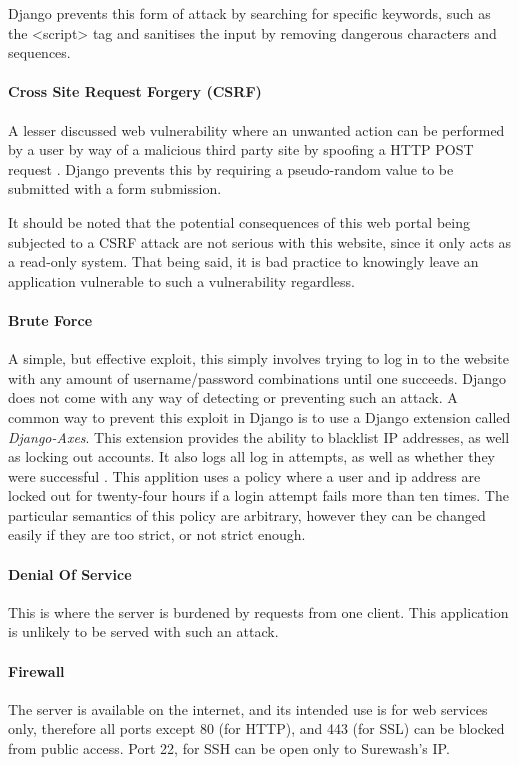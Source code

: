         Django prevents this form of attack by searching for specific keywords, such as the <script> tag and sanitises the input by removing dangerous characters and sequences.

        \paragraph{Cross Site Request Forgery (CSRF)}
        A lesser discussed web vulnerability where an unwanted action can be performed by a user by way of a malicious third party site by spoofing a HTTP POST request \cite{zeller2008cross}. Django prevents this by requiring a pseudo-random value to be submitted with a form submission.

        It should be noted that the potential consequences of this web portal being subjected to a CSRF attack are not serious with this website, since it only acts as a read-only system. That being said, it is bad practice to knowingly leave an application vulnerable to such a vulnerability regardless.

        \paragraph{Brute Force}
        A simple, but effective exploit, this simply involves trying to log in to the website with any amount of username/password combinations until one succeeds. Django does not come with any way of detecting or preventing such an attack. A common way to prevent this exploit in Django is to use a Django extension called {\slshape Django-Axes}. This extension provides the ability to blacklist IP addresses, as well as locking out accounts. It also logs all log in attempts, as well as whether they were successful \cite{djangoaxes}. This applition uses a policy where a user and ip address are locked out for twenty-four hours if a login attempt fails more than ten times. The particular semantics of this policy are arbitrary, however they can be changed easily if they are too strict, or not strict enough.

        \paragraph{Denial Of Service}
        This is where the server is burdened by requests from one client. This application is unlikely to be served with such an attack.

        \paragraph{Firewall}
        The server is available on the internet, and its intended use is for web services only, therefore all ports except 80 (for HTTP), and 443 (for SSL) can be blocked from public access. Port 22, for SSH can be open only to Surewash's IP.
    
